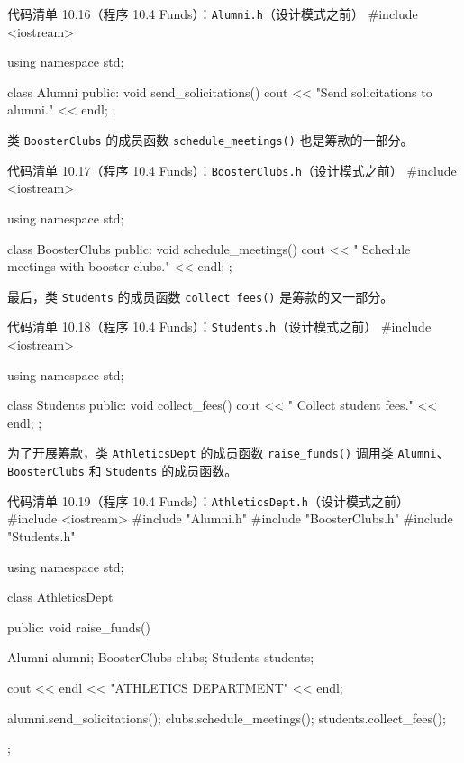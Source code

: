 \begin{codeboxt}{代码清单 10.16（程序 10.4 Funds）：\texttt{Alumni.h}（设计模式之前）}
#include <iostream>

using namespace std;

class Alumni
{
public:
    void send_solicitations()
    {
        cout << "Send solicitations to alumni." << endl;
    }
};
\end{codeboxt}

类 \texttt{Booster\allowbreak{}Clubs} 的成员函数 \texttt{schedule\_\allowbreak{}meetings(\allowbreak{})\allowbreak{}} 也是筹款的一部分。

\begin{codeboxt}{代码清单 10.17（程序 10.4 Funds）：\texttt{Booster\allowbreak{}Clubs.\allowbreak{}h}（设计模式之前）}
#include <iostream>

using namespace std;

class BoosterClubs
{
public:
    void schedule_meetings()
    {
        cout << " Schedule meetings with booster clubs." << endl;
    }
};
\end{codeboxt}

最后，类 \texttt{Students} 的成员函数 \texttt{collect\_\allowbreak{}fees(\allowbreak{})\allowbreak{}} 是筹款的又一部分。

\begin{codeboxt}{代码清单 10.18（程序 10.4 Funds）：\texttt{Students.\allowbreak{}h}（设计模式之前）}
#include <iostream>

using namespace std;

class Students
{
public:
    void collect_fees()
    {
        cout << " Collect student fees." << endl;
    }
};
\end{codeboxt}

为了开展筹款，类 \texttt{Athletics\allowbreak{}Dept} 的成员函数 \texttt{raise\_\allowbreak{}funds(\allowbreak{})\allowbreak{}} 调用类 \texttt{Alumni}、\texttt{Booster\allowbreak{}Clubs} 和 \texttt{Students} 的成员函数。

\begin{codeboxt}{代码清单 10.19（程序 10.4 Funds）：\texttt{Athletics\allowbreak{}Dept.\allowbreak{}h}（设计模式之前）}
#include <iostream>
#include "Alumni.h"
#include "BoosterClubs.h"
#include "Students.h"

using namespace std;

class AthleticsDept
{
public:
    void raise_funds()
    {
        Alumni alumni;
        BoosterClubs clubs;
        Students students;

        cout << endl << "ATHLETICS DEPARTMENT" << endl;

        alumni.send_solicitations();
        clubs.schedule_meetings();
        students.collect_fees();
    }
};
\end{codeboxt}

